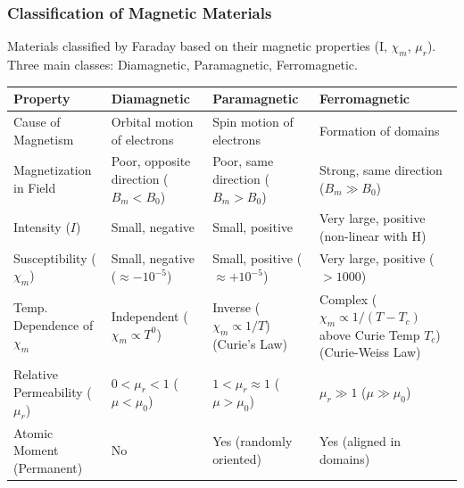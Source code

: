 \begin{frame}[t]
    \frametitle{\textcolor{deepnavy}{\textbf{Classification of Magnetic Materials}}}
    \renewcommand{\familydefault}{\rmdefault}
    \tiny %

      \item<+-> Materials classified by Faraday based on their magnetic properties (I, $\chi_m$, $\mu_r$).   Three main classes: Diamagnetic, Paramagnetic, Ferromagnetic.

    \vspace{0.5em}

    \begin{table}
    \centering
    \renewcommand{\arraystretch}{1.1} %
    \begin{tabular}{|p{2.5cm}|p{3cm}|p{3cm}|p{3cm}|}
        \hline
        \rowcolor{gray!20} \textbf{Property} & \textbf{Diamagnetic} & \textbf{Paramagnetic} & \textbf{Ferromagnetic} \\ \hline
          Cause of Magnetism & Orbital motion of electrons   & Spin motion of electrons   & Formation of domains \\ \hline
          Magnetization in Field & Poor, opposite direction ($B_m < B_0$)   & Poor, same direction ($B_m > B_0$)   & Strong, same direction ($B_m \gg B_0$) \\ \hline
          Intensity ($I$) & Small, negative   & Small, positive   & Very large, positive (non-linear with H) \\ \hline
          Susceptibility ($\chi_m$) & Small, negative ($\approx -10^{-5}$)   & Small, positive ($\approx +10^{-5}$)   & Very large, positive ($> 1000$) \\ \hline
        Temp.   Dependence of $\chi_m$ & Independent ($\chi_m \propto T^0$)   & Inverse ($\chi_m \propto 1/T$) (Curie's Law)   & Complex ($\chi_m \propto 1/(T-T_c)$ above Curie Temp $T_c$) (Curie-Weiss Law) \\ \hline
          Relative Permeability ($\mu_r$) & $0 < \mu_r < 1$ ($\mu < \mu_0$)   & $1 < \mu_r \approx 1$ ($\mu > \mu_0$)   & $\mu_r \gg 1$ ($\mu \gg \mu_0$) \\ \hline
          Atomic Moment (Permanent) & No   & Yes (randomly oriented)   & Yes (aligned in domains) \\ \hline
    \end{tabular}
    \end{table}
\end{frame}

